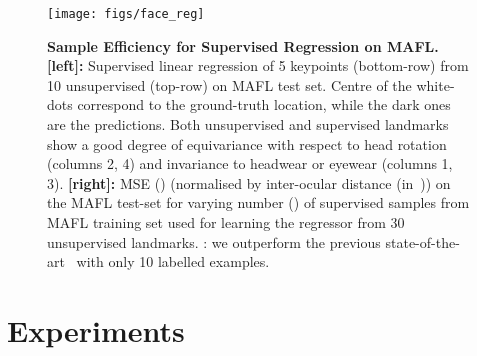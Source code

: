 \documentclass{article}
\begin{document}
\begin{figure}[t!]
\begin{minipage}{\textwidth}
  \begin{minipage}[m]{0.570\textwidth}\hbox{}\texttt{[image: figs/face\_reg]}
  \end{minipage}
  \begin{minipage}[b]{0.430\textwidth}\hbox{}\setlength{\tabcolsep}{1mm}
  \end{minipage}
\end{minipage}
\caption{{\bf Sample Efficiency for Supervised Regression on MAFL.}
{\bf [left]:} Supervised linear regression of 5 keypoints (bottom-row) from 10 unsupervised (top-row) on MAFL test set.
Centre of the white-dots correspond to the ground-truth location, while the dark ones are the predictions.
Both unsupervised and supervised landmarks show a good degree of equivariance with respect to head rotation (columns 2, 4) and invariance to headwear or eyewear (columns 1, 3).
{\bf [right]:} MSE () (normalised by inter-ocular distance (in~)) on the MAFL test-set for varying number () of supervised samples from MAFL training set used for learning the regressor from 30 unsupervised landmarks.
: we outperform the previous state-of-the-art~\cite{thewlis17unsupervised} with only 10 labelled examples.}\label{fig:sample-efficiency}
\end{figure}
 
\section{Experiments}\label{s:experiments}
\end{document}
